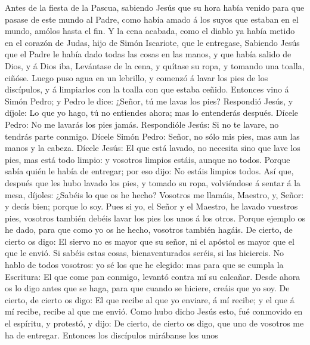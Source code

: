  Antes de la fiesta de la Pascua, sabiendo Jesús que su hora
había venido para que pasase de este mundo al Padre, como había amado á
los suyos que estaban en el mundo, amólos hasta el fin.  Y
la cena acabada, como el diablo ya había metido en el corazón de Judas,
hijo de Simón Iscariote, que le entregase,  Sabiendo Jesús
que el Padre le había dado todas las cosas en las manos, y que había
salido de Dios, y á Dios iba,  Levántase de la cena, y
quítase su ropa, y tomando una toalla, ciñóse.  Luego puso
agua en un lebrillo, y comenzó á lavar los pies de los discípulos, y á
limpiarlos con la toalla con que estaba ceñido.  Entonces
vino á Simón Pedro; y Pedro le dice: ¿Señor, tú me lavas los pies?
 Respondió Jesús, y díjole: Lo que yo hago, tú no entiendes
ahora; mas lo entenderás después.  Dícele Pedro: No me
lavarás los pies jamás. Respondióle Jesús: Si no te lavare, no tendrás
parte conmigo.  Dícele Simón Pedro: Señor, no sólo mis pies,
mas aun las manos y la cabeza.  Dícele Jesús: El que está
lavado, no necesita sino que lave los pies, mas está todo limpio: y
vosotros limpios estáis, aunque no todos.  Porque sabía
quién le había de entregar; por eso dijo: No estáis limpios todos.
 Así que, después que les hubo lavado los pies, y tomado su
ropa, volviéndose á sentar á la mesa, díjoles: ¿Sabéis lo que os he
hecho?  Vosotros me llamáis, Maestro, y, Señor: y decís
bien; porque lo soy.  Pues si yo, el Señor y el Maestro, he
lavado vuestros pies, vosotros también debéis lavar los pies los unos á
los otros.  Porque ejemplo os he dado, para que como yo os
he hecho, vosotros también hagáis.  De cierto, de cierto os
digo: El siervo no es mayor que su señor, ni el apóstol es mayor que el
que le envió.  Si sabéis estas cosas, bienaventurados
seréis, si las hiciereis.  No hablo de todos vosotros: yo
sé los que he elegido: mas para que se cumpla la Escritura: El que come
pan conmigo, levantó contra mí su calcañar.  Desde ahora os
lo digo antes que se haga, para que cuando se hiciere, creáis que yo
soy.  De cierto, de cierto os digo: El que recibe al que yo
enviare, á mí recibe; y el que á mí recibe, recibe al que me envió.
 Como hubo dicho Jesús esto, fué conmovido en el espíritu,
y protestó, y dijo: De cierto, de cierto os digo, que uno de vosotros me
ha de entregar.  Entonces los discípulos mirábanse los unos
